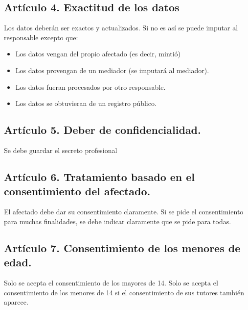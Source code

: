 \documentclass[letterpaper,10pt,spanish]{sphinxmanual}
\begin{document}
\subsection{Artículo 4. Exactitud de los datos}
\label{\detokenize{tema_lopd/tema_lopd:articulo-4-exactitud-de-los-datos}}
Los datos deberán ser exactos y actualizados. Si no es así se puede imputar al responsable excepto que:
\begin{itemize}
\item {} 
Los datos vengan del propio afectado (es decir, mintió)

\item {} 
Los datos provengan de un mediador (se imputará al mediador).

\item {} 
Los datos fueran procesados por otro responsable.

\item {} 
Los datos se obtuvieran de un registro público.

\end{itemize}


\subsection{Artículo 5. Deber de confidencialidad.}
\label{\detokenize{tema_lopd/tema_lopd:articulo-5-deber-de-confidencialidad}}
Se debe guardar el secreto profesional 


\subsection{Artículo 6. Tratamiento basado en el consentimiento del afectado.}
\label{\detokenize{tema_lopd/tema_lopd:articulo-6-tratamiento-basado-en-el-consentimiento-del-afectado}}
El afectado debe dar su consentimiento claramente. Si se pide el consentimiento para muchas finalidades, se debe indicar claramente que se pide para todas. 


\subsection{Artículo 7. Consentimiento de los menores de edad.}
\label{\detokenize{tema_lopd/tema_lopd:articulo-7-consentimiento-de-los-menores-de-edad}}
Solo se acepta el consentimiento de los mayores de 14. Solo se acepta el consentimiento de los menores de 14 si el consentimiento de sus tutores también aparece.
\end{document}
